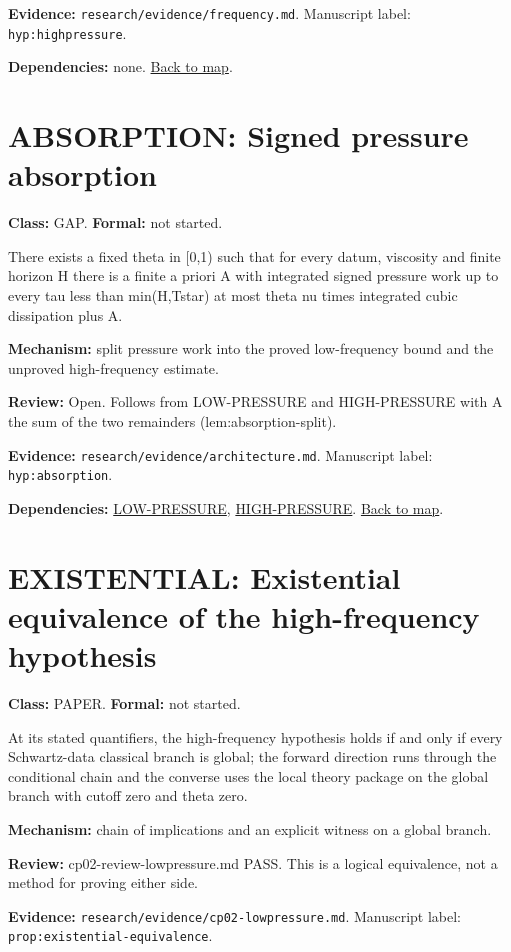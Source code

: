 \documentclass[10pt]{article}
\begin{document}
\textbf{Evidence:} \texttt{research/evidence/frequency.md}. Manuscript label: \texttt{hyp:highpressure}.

\textbf{Dependencies:} none. \hyperref[map]{Back to map}.

\section*{ABSORPTION: Signed pressure absorption}\label{node:ABSORPTION}
\textbf{Class:} GAP. \textbf{Formal:} not started.

There exists a fixed theta in [0,1) such that for every datum, viscosity and finite horizon H there is a finite a priori A with integrated signed pressure work up to every tau less than min(H,Tstar) at most theta nu times integrated cubic dissipation plus A.

\textbf{Mechanism:} split pressure work into the proved low-frequency bound and the unproved high-frequency estimate.

\textbf{Review:} Open. Follows from LOW-PRESSURE and HIGH-PRESSURE with A the sum of the two remainders (lem:absorption-split).

\textbf{Evidence:} \texttt{research/evidence/architecture.md}. Manuscript label: \texttt{hyp:absorption}.

\textbf{Dependencies:} \hyperref[node:LOW-PRESSURE]{LOW-PRESSURE}, \hyperref[node:HIGH-PRESSURE]{HIGH-PRESSURE}. \hyperref[map]{Back to map}.

\section*{EXISTENTIAL: Existential equivalence of the high-frequency hypothesis}\label{node:EXISTENTIAL}
\textbf{Class:} PAPER. \textbf{Formal:} not started.

At its stated quantifiers, the high-frequency hypothesis holds if and only if every Schwartz-data classical branch is global; the forward direction runs through the conditional chain and the converse uses the local theory package on the global branch with cutoff zero and theta zero.

\textbf{Mechanism:} chain of implications and an explicit witness on a global branch.

\textbf{Review:} cp02-review-lowpressure.md PASS. This is a logical equivalence, not a method for proving either side.

\textbf{Evidence:} \texttt{research/evidence/cp02-lowpressure.md}. Manuscript label: \texttt{prop:existential-equivalence}.
\end{document}
